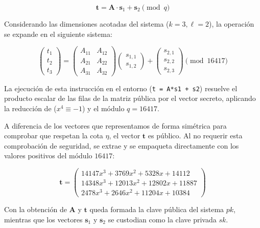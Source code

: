\documentclass[11pt, a4paper]{report}
\theoremstyle{definition}
\begin{document}
\begin{equation}
    \mathbf{t} = \mathbf{A} \cdot \mathbf{s}_1 + \mathbf{s}_2 \pmod{q}
\end{equation}

Considerando las dimensiones acotadas del sistema ($k=3, \ell=2$), la operación se expande en el siguiente sistema:

\begin{equation}
    \begin{pmatrix} t_1 \\ t_2 \\ t_3 \end{pmatrix} = 
    \begin{pmatrix} 
    A_{11} & A_{12} \\ 
    A_{21} & A_{22} \\ 
    A_{31} & A_{32} 
    \end{pmatrix} 
    \begin{pmatrix} s_{1,1} \\ s_{1,2} \end{pmatrix} + 
    \begin{pmatrix} s_{2,1} \\ s_{2,2} \\ s_{2,3} \end{pmatrix} \pmod{16417}
\end{equation}

La ejecución de esta instrucción en el entorno (\texttt{t = A*s1 + s2}) resuelve el producto escalar de las filas de la matriz pública por el vector secreto, aplicando la reducción de ($x^4 \equiv -1$) y el módulo $q = 16417$. 

A diferencia de los vectores que representamos de forma simétrica para comprobar que respetan la cota $\eta$, el vector $\mathbf{t}$ es público. Al no requerir esta comprobación de seguridad, se extrae y se empaqueta directamente con los valores positivos del módulo $16417$:

\begin{equation}
    \mathbf{t} = \begin{pmatrix}
    14147x^3 + 3769x^2 + 5328x + 14112 \\
    14348x^3 + 12013x^2 + 12802x + 11887 \\
    2478x^3 + 2646x^2 + 11204x + 10384
    \end{pmatrix}
\end{equation}

Con la obtención de $\mathbf{A}$ y $\mathbf{t}$ queda formada la clave pública del sistema $pk$, mientras que los vectores $\mathbf{s}_1$ y $\mathbf{s}_2$ se custodian como la clave privada $sk$.
\end{document}
